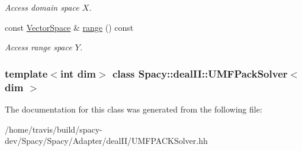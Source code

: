 \begin{DoxyCompactItemize}
\begin{DoxyCompactList}\small\item\em \-Access domain space $X$. \end{DoxyCompactList}\item 
\hypertarget{classSpacy_1_1OperatorBase_ab19d3b7a6f290b1079248f1e567e53d6}{const \hyperlink{classSpacy_1_1VectorSpace}{\-Vector\-Space} \& \hyperlink{classSpacy_1_1OperatorBase_ab19d3b7a6f290b1079248f1e567e53d6}{range} () const }\label{classSpacy_1_1OperatorBase_ab19d3b7a6f290b1079248f1e567e53d6}

\begin{DoxyCompactList}\small\item\em \-Access range space $Y$. \end{DoxyCompactList}\end{DoxyCompactItemize}
\subsubsection*{template$<$int dim$>$ class Spacy\-::deal\-I\-I\-::\-U\-M\-F\-Pack\-Solver$<$ dim $>$}



\-The documentation for this class was generated from the following file\-:\begin{DoxyCompactItemize}
\item 
/home/travis/build/spacy-\/dev/\-Spacy/\-Spacy/\-Adapter/deal\-I\-I/\-U\-M\-F\-P\-A\-C\-K\-Solver.\-hh\end{DoxyCompactItemize}

